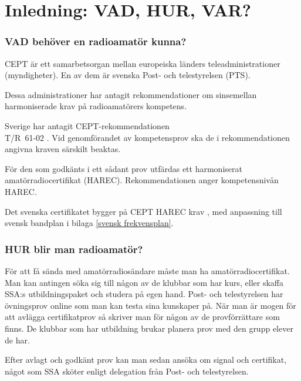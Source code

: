 
\chapter*{Inledning: VAD, HUR, VAR?}

\subsection*{VAD behöver en radioamatör kunna?}
\balance

CEPT är ett samarbetsorgan mellan europeiska länders teleadministrationer
(myndigheter). En av dem är svenska Post- och telestyrelsen (PTS).

Dessa administrationer har antagit rekommendationer om sinsemellan
harmoniserade krav på radioamatörers kompetens.

Sverige har antagit CEPT-rekommendationen\\
T/R~61-02 \cite{TR6102}.
Vid genomförandet av kompetensprov ska de i rekommendationen
angivna kraven särskilt beaktas.

För den som godkänts i ett sådant prov utfärdas ett harmoniserat
amatörradiocertifikat (HAREC).
Rekommendationen anger kompetensnivån HAREC.

Det svenska certifikatet bygger på CEPT HAREC krav \cite{TR6102},
med anpassning till svensk bandplan i bilaga \ref{svensk frekvensplan}.

\subsection*{HUR blir man radioamatör?}

För att få sända med amatörradiosändare måste man ha amatörradiocertifikat.
Man kan antingen söka sig till någon av de klubbar som har kurs, eller skaffa
SSA:s utbildningspaket och studera på egen hand.
Post- och telestyrelsen har övningsprov online som man kan testa sina kunskaper
på.
När man är mogen för att avlägga certifikatprov så skriver man för någon av de
provförrättare som finns.
De klubbar som har utbildning brukar planera prov med den grupp elever de har.


Efter avlagt och godkänt prov kan man sedan ansöka om signal och certifikat,
något som SSA sköter enligt delegation från Post- och telestyrelsen.


